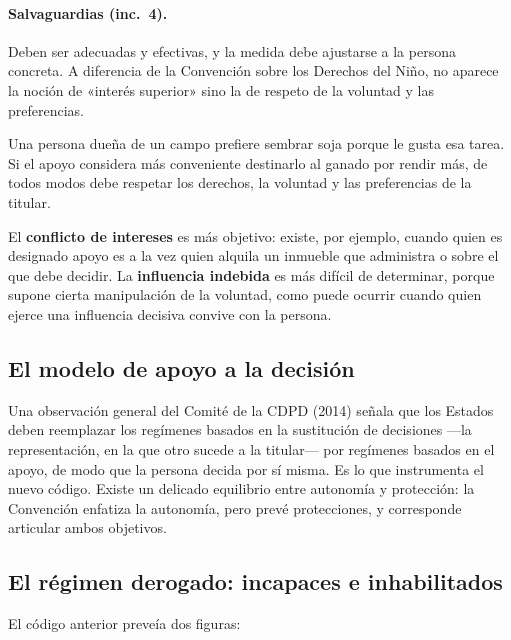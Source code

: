 \documentclass[12pt,oneside]{book}
\begin{document}
\paragraph{Salvaguardias (inc.~4).} Deben ser adecuadas y efectivas, y la medida debe ajustarse a la persona concreta. A diferencia de la Convención sobre los Derechos del Niño, no aparece la noción de «interés superior» sino la de respeto de la voluntad y las preferencias.

\begin{ejemplo}
Una persona dueña de un campo prefiere sembrar soja porque le gusta esa tarea. Si el apoyo considera más conveniente destinarlo al ganado por rendir más, de todos modos debe respetar los derechos, la voluntad y las preferencias de la titular.
\end{ejemplo}

\begin{definicion}
El \textbf{conflicto de intereses} es más objetivo: existe, por ejemplo, cuando quien es designado apoyo es a la vez quien alquila un inmueble que administra o sobre el que debe decidir. La \textbf{influencia indebida} es más difícil de determinar, porque supone cierta manipulación de la voluntad, como puede ocurrir cuando quien ejerce una influencia decisiva convive con la persona.
\end{definicion}

\subsection{El modelo de apoyo a la decisión}

Una observación general del Comité de la CDPD (2014) señala que los Estados deben reemplazar los regímenes basados en la sustitución de decisiones ---la representación, en la que otro sucede a la titular--- por regímenes basados en el apoyo, de modo que la persona decida por sí misma. Es lo que instrumenta el nuevo código. Existe un delicado equilibrio entre autonomía y protección: la Convención enfatiza la autonomía, pero prevé protecciones, y corresponde articular ambos objetivos.

\subsection{El régimen derogado: incapaces e inhabilitados}

El código anterior preveía dos figuras:
\end{document}
